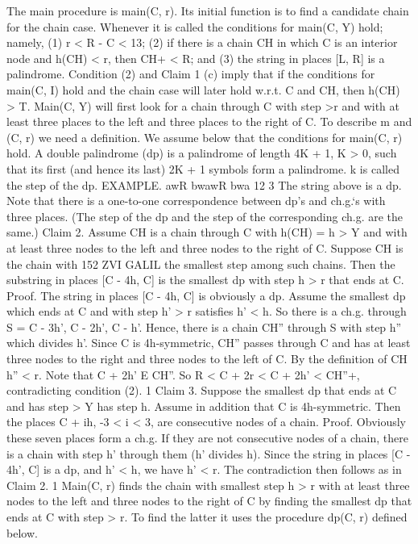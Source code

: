 \documentclass[11pt,a4paper]{report}
\begin{document}
The main procedure is main(C, r). Its initial function is to find a candidate chain for
the chain case. Whenever it is called the conditions for main(C, Y) hold; namely, (1) r <
R - C < 13; (2) if there is a chain CH in which C is an interior node and h(CH) < r,
then CH+ < R; and (3) the string in places [L, R] is a palindrome. Condition (2) and
Claim 1 (c) imply that if the conditions for main(C, I) hold and the chain case will later
hold w.r.t. C and CH, then h(CH) > T.
Main(C, Y) will first look for a chain through C with step >r and with at least three
places to the left and three places to the right of C. To describe m and (C, r) we need a
definition. We assume below that the conditions for main(C, r) hold.
A double palindrome (dp) is a palindrome of length 4K + 1, K > 0, such that its first
(and hence its last) 2K + 1 symbols form a palindrome. k is called the step of the dp.
EXAMPLE.
awR bwawR bwa
12 3
The string above is a dp. Note that there is a one-to-one correspondence between dp’s
and ch.g.‘s with three places. (The step of the dp and the step of the corresponding ch.g.
are the same.)
Claim 2. Assume CH is a chain through C with h(CH) = h > Y and with at least
three nodes to the left and three nodes to the right of C. Suppose CH is the chain with 
152 ZVI GALIL
the smallest step among such chains. Then the substring in places [C - 4h, C] is the smallest
dp with step h > r that ends at C.
Proof. The string in places [C - 4h, C] is obviously a dp. Assume the smallest dp
which ends at C and with step h’ > r satisfies h’ < h. So there is a ch.g. through S =
{C - 3h’, C - 2h’, C - h’}. Hence, there is a chain CH” through S with step h” which
divides h’. Since C is 4h-symmetric, CH” passes through C and has at least three nodes
to the right and three nodes to the left of C. By the definition of CH h” < r. Note that
C + 2h’ E CH”. So R < C + 2r < C + 2h’ < CH”+, contradicting condition (2). 1
Claim 3. Suppose the smallest dp that ends at C and has step > Y has step h. Assume
in addition that C is 4h-symmetric. Then the places C + ih, -3 < i < 3, are consecutive
nodes of a chain.
Proof. Obviously these seven places form a ch.g. If they are not consecutive nodes
of a chain, there is a chain with step h’ through them (h’ divides h). Since the string in
places [C - 4h’, C] is a dp, and h’ < h, we have h’ < r. The contradiction then follows
as in Claim 2. 1
Main(C, r) finds the chain with smallest step h > r with at least three nodes to the left
and three nodes to the right of C by finding the smallest dp that ends at C with step > r.
To find the latter it uses the procedure dp(C, r) defined below.
\end{document}
